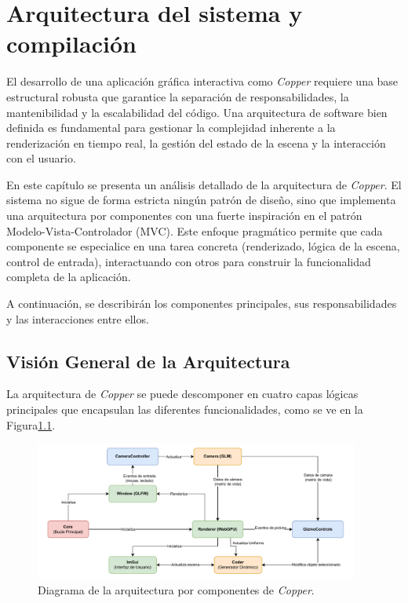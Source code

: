 \chapter{Arquitectura del sistema y compilación}

El desarrollo de una aplicación gráfica interactiva como \textit{Copper}
requiere una base estructural robusta que garantice la separación de
responsabilidades, la mantenibilidad y la escalabilidad del código. Una
arquitectura de software bien definida es fundamental para gestionar la
complejidad inherente a la renderización en tiempo real, la gestión del estado
de la escena y la interacción con el usuario.

En este capítulo se presenta un análisis detallado de la arquitectura de
\textit{Copper}. El sistema no sigue de forma estricta ningún patrón de diseño,
sino que implementa una arquitectura por componentes con una fuerte
inspiración en el patrón Modelo-Vista-Controlador (MVC). Este enfoque
pragmático permite que cada componente se especialice en una tarea concreta
(renderizado, lógica de la escena, control de entrada), interactuando con otros
para construir la funcionalidad completa de la aplicación.

A continuación, se describirán los componentes principales, sus
responsabilidades y las interacciones entre ellos.

\section{Visión General de la Arquitectura}

La arquitectura de \textit{Copper} se puede descomponer en cuatro capas lógicas
principales que encapsulan las diferentes funcionalidades, como se ve en la
Figura\ref{fig:diagrama_arquitectura}.

\begin{figure}[H]
    \begin{center}
    \includegraphics[width=0.95\textwidth]{imagenes/diagrama_arquitectura.pdf}
    \end{center}
    \caption{Diagrama de la arquitectura por componentes de \textit{Copper}.}
    \label{fig:diagrama_arquitectura}
\end{figure}


